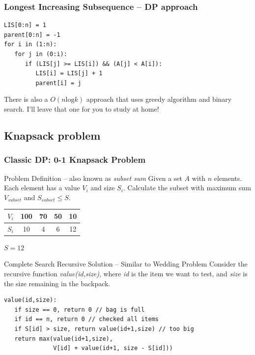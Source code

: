 \documentclass{beamer}
\begin{document}
\begin{frame}[fragile]
  \frametitle{Longest Increasing Subsequence -- DP approach}
  \begin{block}{}
  {\small
\begin{verbatim}
LIS[0:n] = 1
parent[0:n] = -1
for i in (1:n):
   for j in (0:i):
      if (LIS[j] >= LIS[i]) && (A[j] < A[i]):
         LIS[i] = LIS[j] + 1
         parent[i] = j
\end{verbatim}
  }
  \end{block}

\vfill

\begin{block}{}
  There is also a $O(n\text{log}k)$ approach that uses greedy
  algorithm and binary search. I'll leave that one for you to study at home!
\end{block}
\end{frame}

\subsection{Knapsack problem}
\begin{frame}[fragile]
  \frametitle{Classic DP: 0-1 Knapsack Problem}
  {\smaller
  \begin{block}{Problem Definition -- also known as \emph{subset sum}}
    Given a set $A$ with $n$ elements. Each element has a value $V_i$
    and size $S_i$. Calculate the subset with maximum sum
    $V_{subset}$ and $S_{subset} \leq S$.
  \end{block}

  \medskip

  \begin{tabular}{|c|c|c|c|c|}
    \hline
    $V_i$ & 100 & 70 & 50 & 10\\
    \hline
    $S_i$ & 10 & 4 & 6 & 12\\
    \hline
  \end{tabular}
  
  \smallskip
  
  $S = 12$

  \begin{block}{Complete Search Recursive Solution -- Similar to Wedding Problem}
    Consider the recursive function \emph{value(id,size)}, where
    \emph{id} is the item we want to test, and \emph{size} is the size
    remaining in the backpack.

    \medskip

\begin{verbatim}
value(id,size):
   if size == 0, return 0 // bag is full
   if id == n, return 0 // checked all items
   if S[id] > size, return value(id+1,size) // too big
   return max(value(id+1,size), 
              V[id] + value(id+1, size - S[id]))
\end{verbatim}
  \end{block}
  }
\end{frame}
\end{document}
